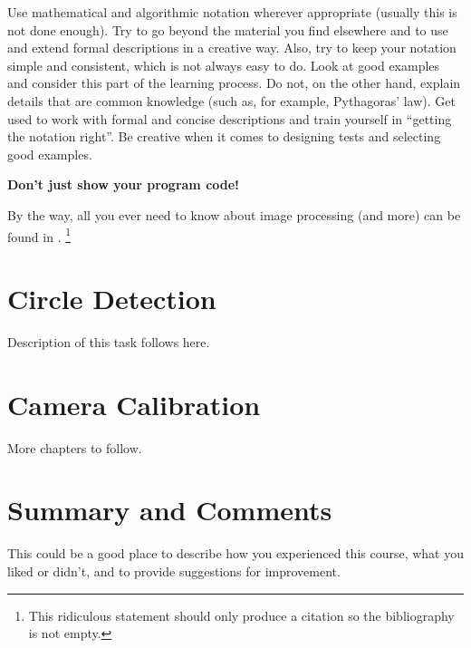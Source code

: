 \documentclass[a4paper,english,11pt]{report}
\begin{document}
Use mathematical and algorithmic notation wherever appropriate (usually this is not done enough). Try to go beyond the material you find elsewhere and to use and extend formal descriptions in a creative way. Also, try to keep your notation simple and consistent, which is not always easy to do. Look at good examples and consider this part of the learning process. Do not, on the other hand, explain details that are common knowledge (such as, for example, Pythagoras' law). Get used to work with formal and concise descriptions and train yourself in ``getting the notation right''.
Be creative when it comes to designing tests and selecting good examples.
%
\begin{center}
\textbf{Don't just show your program code!} 
\end{center}
%
By the way, all you ever need to know about image processing (and more) can be 
found in \cite{BurgerBurge2016}.%
\footnote{This ridiculous statement should only produce a citation so the 
bibliography is not empty.} 


\chapter{Circle Detection}

Description of this task follows here.



\chapter{Camera Calibration}

More chapters to follow.



\chapter{Summary and Comments}

This could be a good place to describe how you experienced this course, what you liked or didn't, and to provide suggestions for improvement.


\MakeBibliography[nosplit]
\end{document}
